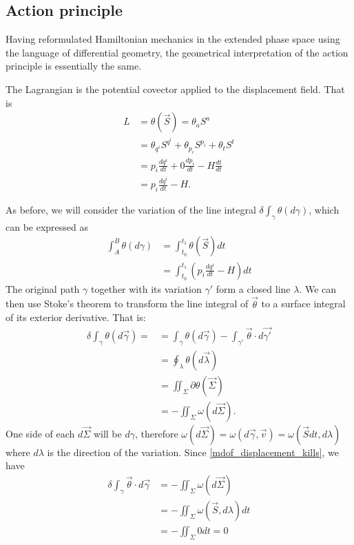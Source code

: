 \documentclass[10pt,twocolumn, nofootinbib]{revtex4-2}
\begin{document}
\subsection{Action principle}
Having reformulated Hamiltonian mechanics in the extended phase space using the language of differential geometry, the geometrical interpretation of the action principle is essentially the same.

The Lagrangian is the potential covector applied to the displacement field. That is
\begin{equation}
\begin{aligned}
L &= \theta(\vec{S}) = \theta_a S^a \\
&= \theta_{q^i} S^{q^i} + \theta_{p_i} S^{p_i} + \theta_{t} S^{t} \\
&= p_i \frac{dq^i}{dt} + 0 \frac{dp_i}{dt} - H \frac{dt}{dt} \\
&= p_i \frac{dq^i}{dt} - H.
\end{aligned}
\end{equation}

As before, we will consider the variation of the line integral $\delta \int_{\gamma} \theta(d\gamma)$, which can be expressed as
\begin{equation}
	\begin{aligned}
		\int_A^B \theta(d\gamma) &= \int^{t_1}_{t_0} \theta(\vec{S}) dt \\
		&= \int^{t_1}_{t_0} \left(p_i \frac{dq^i}{dt} - H \right) dt
	\end{aligned}
\end{equation}
The original path $\gamma$ together with its variation $\gamma'$ form a closed line $\lambda$. We can then use Stoke's theorem to transform the line integral of $\vec{\theta}$ to a surface integral of its exterior derivative. That is:
\begin{align*}
	\delta \int_{\gamma} \theta(d\vec{\gamma}) = 
	&= \int_{\gamma} \theta(d\vec{\gamma}) - \int_{\gamma'} \vec{\theta} \cdot d\vec{\gamma'} \\
	&= \oint_{\lambda} \theta(d\vec{\lambda}) \\
	&= \iint_{\Sigma} \partial \theta (\vec{\Sigma}) \\
	&= - \iint_{\Sigma} \omega(d\vec{\Sigma}).
\end{align*}
One side of each $d\vec{\Sigma}$ will be $d\gamma$, therefore $\omega(d\vec{\Sigma}) = \omega(d\vec{\gamma}, \vec{v}) = \omega(\vec{S}dt, d\lambda)$ where $d\lambda$ is the direction of the variation. Since \ref{mdof_displacement_kills}, we have
\begin{equation}
	\begin{aligned}
	\delta \int_{\gamma} \vec{\theta} \cdot d\vec{\gamma} &= - \iint_{\Sigma} \omega(d\vec{\Sigma}) \\
	&= - \iint_{\Sigma} \omega(\vec{S}, d\lambda) dt \\
	&= - \iint_{\Sigma} 0 dt = 0
	\end{aligned}
\end{equation}
\end{document}
